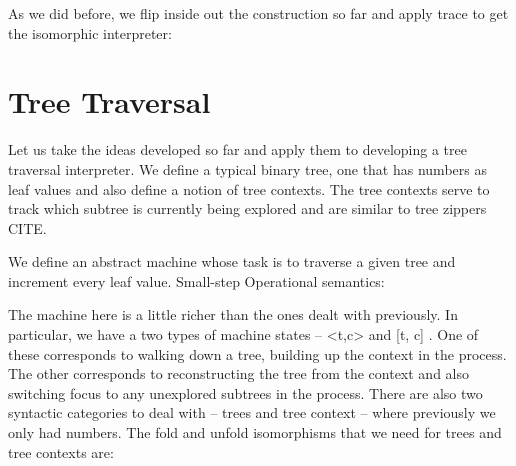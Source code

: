 \documentclass{llncs}
\begin{document}
{\begin{enumerate}
\end{enumerate}

As we did before, we flip inside out the construction so far and
apply {{trace}} to get the isomorphic interpreter:

\begin{center}
\end{center}


\section{Tree Traversal}

Let us take the ideas developed so far and apply them to developing a
tree traversal interpreter. We define a typical binary tree, one that
has numbers as leaf values and also define a notion of tree
contexts. The tree contexts serve to track which subtree is currently
being explored and are similar to tree zippers CITE.

%

We define an abstract machine whose task is to traverse a given tree
and increment every leaf value. Small-step Operational semantics:


The machine here is a little richer than the ones dealt with
previously. In particular, we have a two types of machine states --
{{<t,c>}} and {{ {[t, c]} }}. One of these corresponds to walking
down a tree, building up the context in the process. The other
corresponds to reconstructing the tree from the context and also
switching focus to any unexplored subtrees in the process. There are
also two syntactic categories to deal with -- trees and tree context
-- where previously we only had numbers. The {{fold}} and {{unfold}}
isomorphisms that we need for trees and tree contexts are:

}
\end{document}
